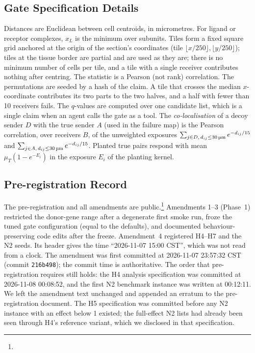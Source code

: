 \documentclass[letterpaper]{article} %
\newcommand{\um}{\ifmmode\,\text{\textmu m}\else\,\textmu m\fi}
\begin{document}
\subsection{Gate Specification Details}
Distances are Euclidean between cell centroids, in micrometres. For ligand or receptor complexes, $x_L$ is the minimum
over subunits. Tiles form a fixed square grid anchored at the origin of the section's coordinates (tile
$\lfloor x/250\rfloor,\lfloor y/250\rfloor$); tiles at the tissue border are partial and are used as they are; there is
no minimum number of cells per tile, and a tile with a single receiver contributes nothing after centring. The
statistic is a Pearson (not rank) correlation. The permutations are seeded by a hash of the claim. A tile that crosses
the median $x$-coordinate contributes its two parts to the two halves, and a half with fewer than 10 receivers fails.
The $q$-values are computed over one candidate list, which is a single claim when an agent calls the gate as a tool.
The \emph{co-localisation} of a decoy sender $D$ with the true sender $A$ (used in the failure map) is the Pearson
correlation, over receivers $B$, of the unweighted exposures $\sum_{j\in D,\,d_{ij}\le30\um} e^{-d_{ij}/15}$ and
$\sum_{j\in A,\,d_{ij}\le30\um} e^{-d_{ij}/15}$. Planted true pairs respond with mean $\mu_T(1-e^{-E_i})$ in the
exposure $E_i$ of the planting kernel.

\subsection{Pre-registration Record}
The pre-registration and all amendments are public.\footnote{\repoPrereg} Amendments 1--3 (Phase~1) restricted the
donor-gene range after a degenerate first smoke run, froze the tuned gate configuration (equal to the defaults), and
documented behaviour-preserving code edits after the freeze. Amendment~4 registered H4--H7 and the N2 seeds. Its header
gives the time ``2026-11-07 15:00 CST'', which was not read from a clock. The amendment was first committed at
2026-11-07 23:57:32 CST (commit \texttt{216b498}); the commit time is authoritative. The order that pre-registration
requires still holds: the H4 analysis specification was committed at 2026-11-08 00:08:52, and the first N2 benchmark
instance was written at 00:12:11. We left the amendment text unchanged and appended an erratum to the pre-registration
document. The H5 specification was committed before any N2 instance with an effect below 1 existed; the full-effect
N2 lists had already been seen through H4's reference variant, which we disclosed in that specification.
\end{document}
